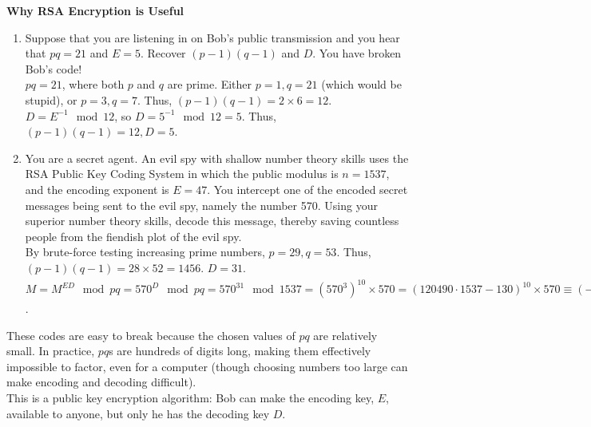 \documentclass{article}
\begin{document}
\textbf{Why RSA Encryption is Useful}
\begin{enumerate} 
    \item Suppose that you are listening in on Bob's public transmission and you hear that $pq = 21$ and $E = 5$. Recover $(p - 1)(q - 1)$ and $D$. You have broken Bob's code!\\
    $pq = 21$, where both $p$ and $q$ are prime. Either $p = 1, q = 21$ (which would be stupid), or $p = 3, q = 7$. Thus, $(p-1)(q-1) = 2 \times 6 = 12$. $D = E^{-1} \mod{12}$, so $D = 5^{-1} \mod{12} = 5$. Thus, $(p-1)(q-1) = 12, D = 5$.
    \item You are a secret agent. An evil spy with shallow number theory skills uses the RSA Public Key Coding System in which the public modulus is $n = 1537$, and the encoding exponent is $E = 47$. You intercept one of the encoded secret messages being sent to the evil spy, namely the number 570. Using your superior number theory skills, decode this message, thereby saving countless people from the fiendish plot of the evil spy.\\
    By brute-force testing increasing prime numbers, $p = 29, q = 53$. Thus, $(p-1)(q-1) = 28 \times 52 = 1456$. $D = 31$. $M = M^{ED} \mod{pq} = 570^{D} \mod{pq}= 570^{31} \mod{1537} = (570^3)^{10} \times 570 = (120490\cdot1537 - 130)^{10} \times 570 \equiv (-130)^{10} \times 570 = ((-130)^2)^{5} \times 570 \equiv (-7)^{5} \times 570 = -16807 \times 570 \equiv 100 \times 570 = 57000 \equiv 131 \mod{1537}$.
\end{enumerate}
These codes are easy to break because the chosen values of $pq$ are relatively small. In practice, $pq$s are hundreds of digits long, making them effectively impossible to factor, even for a computer (though choosing numbers too large can make encoding and decoding difficult).\\
This is a public key encryption algorithm: Bob can make the encoding key, $E$, available to anyone, but only he has the decoding key $D$.
\end{document}
